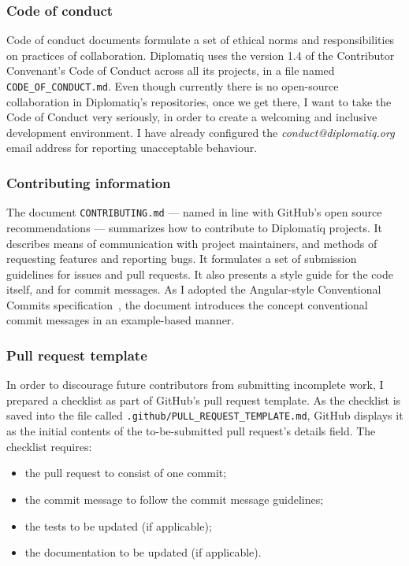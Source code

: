 \subsubsection{Code of conduct}

Code of conduct documents formulate a set of ethical norms and responsibilities on practices of collaboration. Diplomatiq uses the version 1.4 of the Contributor Convenant's Code of Conduct across all its projects, in a file named \lstinline{CODE_OF_CONDUCT.md}. Even though currently there is no open-source collaboration in Diplomatiq's repositories, once we get there, I want to take the Code of Conduct very seriously, in order to create a welcoming and inclusive development environment. I have already configured the \emph{conduct@diplomatiq.org} email address for reporting unacceptable behaviour.

\subsubsection{Contributing information}

The document \lstinline{CONTRIBUTING.md} — named in line with GitHub's open source recommendations — summarizes how to contribute to Diplomatiq projects. It describes means of communication with project maintainers, and methods of requesting features and reporting bugs. It formulates a set of submission guidelines for issues and pull requests. It also presents a style guide for the code itself, and for commit messages. As I adopted the Angular-style Conventional Commits specification~\cite{conventionalcommits}, the document introduces the concept conventional commit messages in an example-based manner.

\subsubsection{Pull request template}

In order to discourage future contributors from submitting incomplete work, I prepared a checklist as part of GitHub's pull request template. As the checklist is saved into the file called \lstinline{.github/PULL_REQUEST_TEMPLATE.md}, GitHub displays it as the initial contents of the to-be-submitted pull request's details field. The checklist requires:

\begin{itemize}
\item the pull request to consist of one commit;
\item the commit message to follow the commit message guidelines;
\item the tests to be updated (if applicable);
\item the documentation to be updated (if applicable).
\end{itemize}

